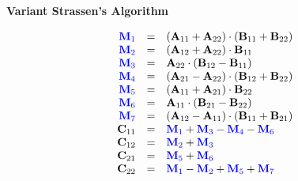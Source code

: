     \begin{center}
        \textbf{Variant Strassen's Algorithm}
        \vspace{-20pt}
    \end{center}
    \begin{equation}
        \begin{array}{rcl}
            \color{blue} \mathbf{M}_1 & = & (\mathbf{A}_{11} + \mathbf{A}_{22})\cdot (\mathbf{B}_{11} + \mathbf{B}_{22}) \\
            \color{blue} \mathbf{M}_2 & = & (\mathbf{A}_{12} + \mathbf{A}_{22})\cdot \mathbf{B}_{11} \\
            \color{blue} \mathbf{M}_3 & = & \mathbf{A}_{22}\cdot (\mathbf{B}_{12} - \mathbf{B}_{11}) \\
            \color{blue} \mathbf{M}_4 & = & (\mathbf{A}_{21} - \mathbf{A}_{22})\cdot (\mathbf{B}_{12} + \mathbf{B}_{22}) \\
            \color{blue} \mathbf{M}_5 & = & (\mathbf{A}_{11} + \mathbf{A}_{21})\cdot \mathbf{B}_{22} \\
            \color{blue} \mathbf{M}_6 & = & \mathbf{A}_{11}\cdot (\mathbf{B}_{21} - \mathbf{B}_{22}) \\
            \color{blue} \mathbf{M}_7 & = & (\mathbf{A}_{12} - \mathbf{A}_{11})\cdot (\mathbf{B}_{11} + \mathbf{B}_{21}) \\
            \mathbf{C}_{11} & = & \color{blue} \mathbf{M}_1 \color{black} + \color{blue} \mathbf{M}_3 \color{black} - \color{blue} \mathbf{M}_4 \color{black} - \color{blue} \mathbf{M}_6 \\
            \mathbf{C}_{12} & = & \color{blue} \mathbf{M}_2 \color{black} + \color{blue} \mathbf{M}_3 \\
            \mathbf{C}_{21} & = & \color{blue} \mathbf{M}_5 \color{black} + \color{blue} \mathbf{M}_6 \\
            \mathbf{C}_{22} & = & \color{blue} \mathbf{M}_1 \color{black} - \color{blue} \mathbf{M}_2 \color{black} + \color{blue} \mathbf{M}_5 \color{black} + \color{blue} \mathbf{M}_7
        \end{array}
        \label{eq:var_strassen}
    \end{equation}

